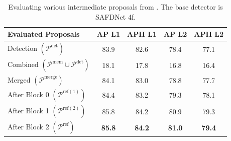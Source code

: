 
\begin{table}[t]
    \centering
    \footnotesize
    \begin{tabular}{@{}lcccc@{}}
        \toprule
        Evaluated Proposals                                   & AP L1        & APH L1       & AP L2  & APH L2      \\ 
        \midrule
        Detection $\left(\mathcal{P}^\mathrm{det}\right)$                  & 83.9            & 82.6          & 78.4  &  77.1       \\
        Combined $\left(\mathcal{P}^\mathrm{mem} \cup \mathcal{P}^\mathrm{det}\right)$                      & 18.1            & 17.8          & 16.8  &  16.4       \\
        Merged $\left(\mathcal{P}^\mathrm{merge}\right)$                   & 84.1            & 83.0          & 78.8  &  77.7       \\ 
        After Block 0 $\left( \mathcal{P}^{\mathrm{ref}(1)} \right)$         & 84.4            & 83.2          & 79.3  &  78.1       \\
        After Block 1 $\left( \mathcal{P}^{\mathrm{ref}(2)} \right)$         & 85.8            & 84.2          & 80.9  &  79.3       \\
        \rowcolor{tablecolor}
        After Block 2 $\left( \mathcal{P}^{\mathrm{ref}} \right)$            & \textbf{85.8}   & \textbf{84.2} & \textbf{81.0} & \textbf{79.4} \\
        \bottomrule
    \end{tabular}
    \caption{Evaluating various intermediate proposals from \ourmodel{}. The base detector is SAFDNet 4f.}
    \vspace{-4mm}
    \label{tab:proposal-eval}
\end{table}